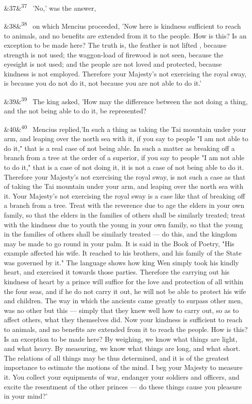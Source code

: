 \documentclass[12pt]{article}
\newcommand{\para}[1][]{\par\noindent\ifx&#1&\else\textsuperscript{\footnotesize #1}~\fi}
\begin{document}
\para[37] 'No,' was the answer,

\para[38] on which Mencius proceeded, 'Now here is kindness sufficient to reach to animals, and no benefits are extended from it to the people. How is this? Is an exception to be made here? The truth is, the feather is not lifted , because strength is not used; the waggon-load of firewood is not seen, because the eyesight is not used; and the people are not loved and protected, because kindness is not employed. Therefore your Majesty's not exercising the royal sway, is because you do not do it, not because you are not able to do it.'

\para[39] The king asked, 'How may the difference between the not doing a thing, and the not being able to do it, be represented?

\para[40] Mencius replied,'In such a thing as taking the Tai mountain under your arm, and leaping over the north sea with it, if you say to people "I am not able to do it," that is a real case of not being able. In such a matter as breaking off a branch from a tree at the order of a superior, if you say to people "I am not able to do it," that is a case of not doing it, it is not a case of not being able to do it. Therefore your Majesty's not exercising the royal sway, is not such a case as that of taking the Tai mountain under your arm, and leaping over the north sea with it. Your Majesty's not exercising the royal sway is a case like that of breaking off a branch from a tree. Treat with the reverence due to age the elders in your own family, so that the elders in the families of others shall be similarly treated; treat with the kindness due to youth the young in your own family, so that the young in the families of others shall be similarly treated --- do this, and the kingdom may be made to go round in your palm. It is said in the Book of Poetry, "His example affected his wife. It reached to his brothers, and his family of the State was governed by it." The language shows how king Wen simply took his kindly heart, and exercised it towards those parties. Therefore the carrying out his kindness of heart by a prince will suffice for the love and protection of all within the four seas, and if he do not carry it out, he will not be able to protect his wife and children. The way in which the ancients came greatly to surpass other men, was no other but this --- simply that they knew well how to carry out, so as to affect others, what they themselves did. Now your kindness is sufficient to reach to animals, and no benefits are extended from it to reach the people. How is this? Is an exception to be made here? By weighing, we know what things are light, and what heavy. By measuring, we know what things are long, and what short. The relations of all things may be thus determined, and it is of the greatest importance to estimate the motions of the mind. I beg your Majesty to measure it. You collect your equipments of war, endanger your soldiers and officers, and excite the resentment of the other princes --- do these things cause you pleasure in your mind?'
\end{document}
